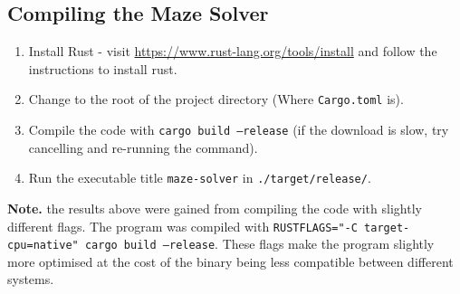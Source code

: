 \documentclass[11pt]{article}
\newcommand{\ssl}[1]{\texttt{#1}}
\begin{document}
\newpage
\begin{appendices}
\section{Compiling the Maze Solver}
\label{compiling}
\begin{enumerate}
\item Install Rust - visit \url{https://www.rust-lang.org/tools/install} and follow the instructions to install rust.
\item Change to the root of the project directory (Where \ssl{Cargo.toml} is).
\item Compile the code with \ssl{cargo build --release} (if the download is slow, try cancelling and re-running the command).
\item Run the executable title \ssl{maze-solver} in \ssl{./target/release/}.
\end{enumerate}

\textbf{Note.} the results above were gained from compiling the code with slightly different flags. The program was compiled with \ssl{RUSTFLAGS="-C target-cpu=native" cargo build --release}. These flags make the program slightly more optimised at the cost of the binary being less compatible between different systems.


\end{appendices}
\end{document}
